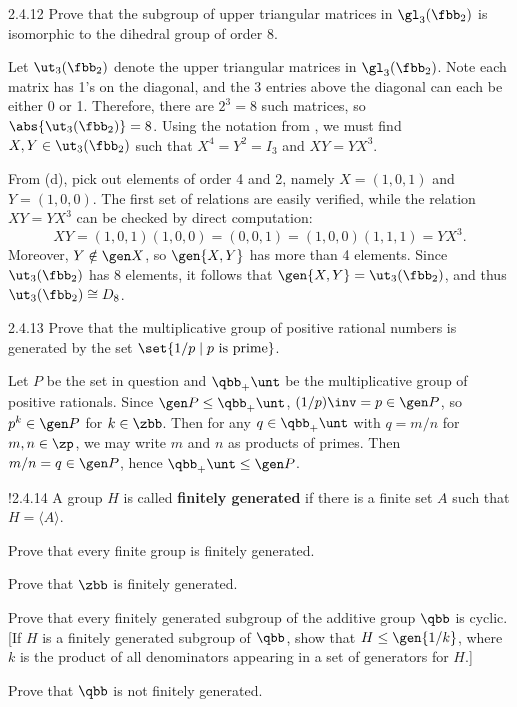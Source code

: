 \begin{exercise}{2.4.12}
    Prove that the subgroup of upper triangular matrices in $\gl_3(\fbb_2)$ is isomorphic to the dihedral group of order $8$.
\end{exercise}

\begin{sol}
    Let $\ut_3(\fbb_2)$ denote the upper triangular matrices in $\gl_3(\fbb_2)$.
	Note each matrix has 1's on the diagonal, and the 3 entries above the diagonal can each be either 0 or 1.
	Therefore, there are $2^3 = 8$ such matrices, so $\abs{\ut_3(\fbb_2)} = 8$.
	Using the notation from , we must find $X, Y \in \ut_3(\fbb_2)$ such that $X^4 = Y^2 = I_3$ and $XY = YX^3$.

    From  (d), pick out elements of order 4 and 2, namely $X = (1, 0, 1)$ and $Y = (1, 0, 0)$.
	The first set of relations are easily verified, while the relation $XY = YX^3$ can be checked by direct computation:
    \[
    	XY = (1, 0, 1)(1, 0, 0) = (0, 0, 1) = (1, 0, 0)(1, 1, 1) = YX^3.
    \]
    Moreover, $Y \notin \gen X$, so $\gen{X, Y}$ has more than 4 elements.
	Since $\ut_3(\fbb_2)$ has 8 elements, it follows that $\gen{X, Y} = \ut_3(\fbb_2)$, and thus $\ut_3(\fbb_2) \cong D_8$.
\end{sol}

\begin{exercise}{2.4.13}
    Prove that the multiplicative group of positive rational numbers is generated by the set $\set{1/p \mid p \text{ is prime}}$.
\end{exercise}

\begin{sol}
    Let $P$ be the set in question and $\qbb_+\unt$ be the multiplicative group of positive rationals.
	Since $\gen P \leq \qbb_+\unt$, $(1 / p)\inv = p \in \gen P$, so $p^k \in \gen P$ for $k \in \zbb$.
	Then for any $q \in \qbb_+\unt$ with $q = m/n$ for $m, n \in \zp$, we may write $m$ and $n$ as products of primes.
	Then $m/n = q \in \gen P$, hence $\qbb_+\unt \leq \gen P$.
\end{sol}

\begin{exercise}!{2.4.14}
    A group $H$ is called \textbf{finitely generated} if there is a finite set $A$ such that $H=\langle A\rangle$.
    \begin{subexercises}
        \item Prove that every finite group is finitely generated.
        \item Prove that $\zbb$ is finitely generated.
        \item Prove that every finitely generated subgroup of the additive group $\qbb$ is cyclic. [If $H$ is a finitely generated subgroup of $\qbb$, show that $H \leq \gen{1/k}$, where $k$ is the product of all denominators appearing in a set of generators for $H$.]
        \item Prove that $\qbb$ is not finitely generated.
    \end{subexercises}
\end{exercise}

